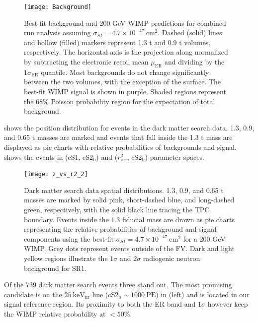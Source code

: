 \begin{figure}
\centering
\texttt{[image: Background]}
\caption{Best-fit background and 200 GeV WIMP predictions for combined run analysis assuming
$\sigma_{SI} = 4.7 \times 10^{-47}\ \mathrm{cm^2}$.  Dashed (solid) lines and hollow (filled)
markers represent 1.3 t and 0.9 t volumes, respectively.  The horizontal axis is the projection along \cstwob normalized by subtracting
the electronic recoil mean $\mu_{\mathrm{ER}}$ and dividing by the $1 \sigma_{\mathrm{ER}}$ quantile.  Most backgrounds do not change
significantly between the two volumes, with the exception of the surface.  The best-fit WIMP signal is shown in purple.  Shaded regions
represent the 68\% Poisson probability region for the expectation of total background.}
\label{fig:dark_matter_results_background}
\end{figure}

 shows the position distribution for events in the dark matter search data.  1.3, 0.9, and 0.65 t
masses are marked and events that fall inside the 1.3 t mass are displayed as pie charts with relative probabilities of backgrounds and
signal.   shows the events in (cS1, cS2$_{\mathrm{b}}$) and
($r_{\mathrm{rec}}^2$, cS2$_{\mathrm{b}}$) parameter spaces.

\begin{figure}
\centering
\texttt{[image: z\_vs\_r2\_2]}
\caption{Dark matter search data spatial distributions.  1.3, 0.9, and 0.65 t masses are marked by solid pink, short-dashed blue, and
long-dashed green, respectively, with the solid black line tracing the TPC boundary.  Events inside the 1.3 fiducial mass are drawn as pie
charts representing the relative probabilities of background and signal components using the best-fit
$\sigma_{SI} = 4.7 \times 10^{-47}\ \mathrm{cm^2}$ for a 200 GeV WIMP.  Grey dots represent events outside of the FV.  Dark and light
yellow regions illustrate the $1 \sigma$ and $2 \sigma$ radiogenic neutron background for SR1.}
\label{fig:dark_matter_results_position}
\end{figure}

Of the 739 dark matter search events three stand out.  The most promising candidate is
on the $25\ \mathrm{keV_{nr}}$ line (cS2$_{\mathrm{b}} \sim 1000\ \mathrm{PE}$) in  (left) and is
located in our signal reference region.  Its proximity to both the ER band and $1 \sigma$ however keep the WIMP relative probability at
$< 50\%$.

